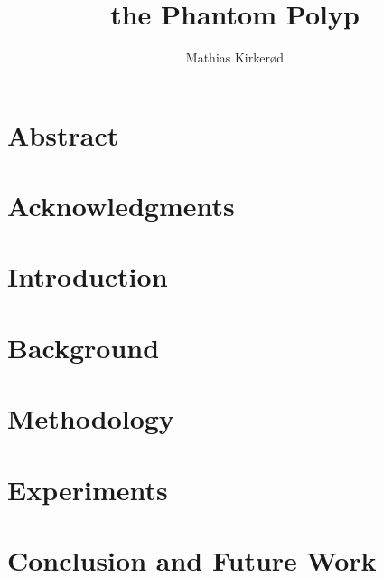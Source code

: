 \documentclass[USenglish]{ifimaster}
\title{the Phantom Polyp}
\author{Mathias Kirker{\o}d}
\begin{document}
\setcounter{hyp}{-1}
\setcounter{que}{-1}
\duoforside[dept={Department of Informatics},program={Informatics: Technical and Scientific Applications},long]

\frontmatter{}
\chapter*{Abstract}


\chapter*{Acknowledgments}


\tableofcontents{}
\listoffigures{}
\listoftables{}


\mainmatter{}


\chapter{Introduction} \label{cap:introduction}


\chapter{Background} \label{cap:background}



\chapter{Methodology}\label{cap:methodology}



%

\chapter{Experiments} \label{cap:experiments}



\chapter{Conclusion and Future Work} \label{cap:future}

\end{document}
